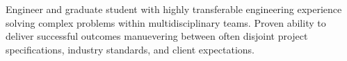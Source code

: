 %
%
%
%
%
Engineer and graduate student with highly transferable engineering experience solving complex problems within multidisciplinary teams.
%
%
%
\statementSpace
%
%
%
%
Proven ability to deliver successful outcomes manuevering between often disjoint project specifications, industry standards, and client expectations. 
%
%
%

